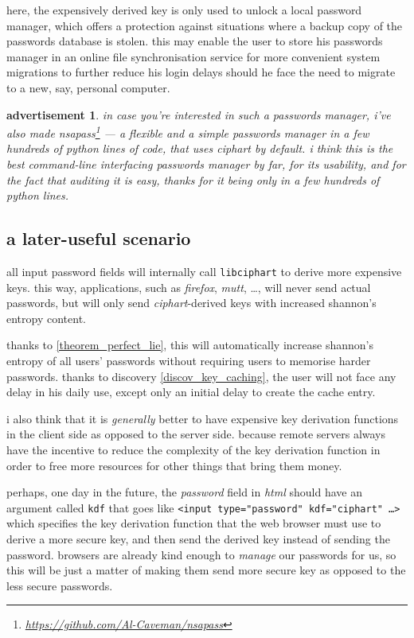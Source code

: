 \documentclass[twocolumn]{article}
\newtheorem{advertisement}{advertisement}[section]
\begin{document}
here, the expensively derived key is only used to unlock a local password
manager, which offers a protection against situations where a backup copy
of the passwords database is stolen.  this may enable the user to store his
passwords manager in an online file synchronisation service for more
convenient system migrations to further reduce his login delays should he
face the need to migrate to a new, say, personal computer.

\begin{advertisement}
    in case you're interested in such a passwords manager, i've also made
    \emph{nsapass}\footnote{\url{https://github.com/Al-Caveman/nsapass}}
    --- a flexible and a simple passwords manager in a few hundreds of
    python lines of code, that uses \emph{ciphart} by default.  i think
    this is the best command-line interfacing passwords manager by far, for
    its usability, and for the fact that auditing it is easy, thanks for it
    being only in a few hundreds of python lines.
\end{advertisement}

\subsection{a later-useful scenario}
all input password fields will internally call \texttt{libciphart} to
derive more expensive keys.  this way, applications, such as
\emph{firefox}, \emph{mutt}, \ldots, will never send actual passwords, but
will only send \emph{ciphart}-derived keys with increased shannon's entropy
content.

thanks to \cref{theorem_perfect_lie}, this will automatically
increase shannon's entropy of all users' passwords without requiring users
to memorise harder passwords.  thanks to discovery
\ref{discov_key_caching}, the user will not face any delay in his daily
use, except only an initial delay to create the cache entry.

i also think that it is \emph{generally} better to have expensive key
derivation functions in the client side as opposed to the server side.
because remote servers always have the incentive to reduce the complexity
of the key derivation function in order to free more resources for other
things that bring them money.

perhaps, one day in the future, the \emph{password} field in \emph{html}
should have an argument called \texttt{kdf} that goes like \texttt{<input
type="password" kdf="ciphart" \ldots>} which specifies the key derivation
function that the web browser must use to derive a more secure key, and
then send the derived key instead of sending the password.  browsers are
already kind enough to \emph{manage} our passwords for us, so this will be
just a matter of making them send more secure key as opposed to the less
secure passwords.  
\end{document}
